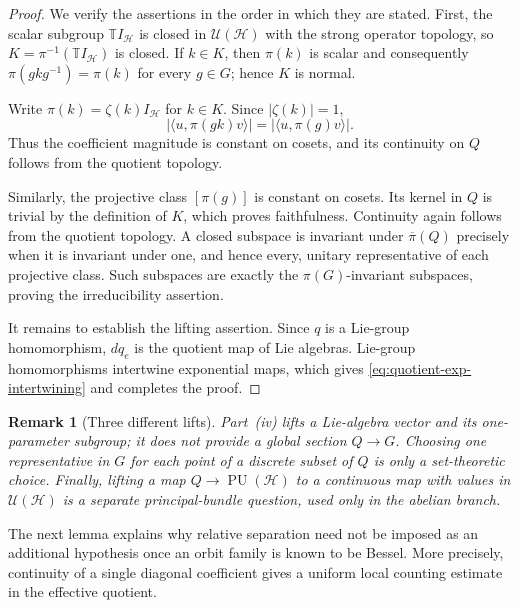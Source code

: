 \documentclass[10pt,a4paper]{amsart}
\numberwithin{equation}{section}
\newtheorem{remark}[theorem]{Remark}
\newcommand{\cH}{\mathcal H}
\newcommand{\T}{\mathbb T}
\newcommand{\U}{\mathcal U}
\newcommand{\PU}{\operatorname{PU}}
\begin{document}
\begin{proof}
We verify the assertions in the order in which they are stated.  First, the
scalar subgroup $\T I_{\cH}$ is closed in $\U(\cH)$ with the strong
operator topology, so $K=\pi^{-1}(\T I_{\cH})$ is closed.  If $k\in K$,
then $\pi(k)$ is scalar and consequently
$\pi(gkg^{-1})=\pi(k)$ for every $g\in G$; hence $K$ is normal.

Write $\pi(k)=\zeta(k)I_{\cH}$ for $k\in K$.  Since $|\zeta(k)|=1$,
\[
 |\langle u,\pi(gk)v\rangle|
 =|\langle u,\pi(g)v\rangle|.
\]
Thus the coefficient magnitude is constant on cosets, and its
continuity on $Q$ follows from the quotient topology.

Similarly, the projective class $[\pi(g)]$ is constant on cosets.  Its kernel
in $Q$ is trivial by the definition of $K$, which proves faithfulness.
Continuity again follows from the quotient topology.  A closed subspace is
invariant under $\overline\pi(Q)$ precisely when it is invariant under one,
and hence every, unitary representative of each projective class.  Such
subspaces are exactly the $\pi(G)$-invariant subspaces, proving the
irreducibility assertion.

It remains to establish the lifting assertion.  Since $q$ is a Lie-group
homomorphism, $dq_e$ is the quotient map of Lie algebras.  Lie-group
homomorphisms intertwine exponential maps, which gives
\eqref{eq:quotient-exp-intertwining} and completes the proof.
\end{proof}

\begin{remark}[Three different lifts]\label{rem:three-lifts}
Part~(iv) lifts a Lie-algebra vector and its one-parameter subgroup; it does
not provide a global section $Q\to G$.  Choosing one representative in $G$
for each point of a discrete subset of $Q$ is only a set-theoretic choice.
Finally, lifting a map $Q\to\PU(\cH)$ to a continuous map with values in
$\U(\cH)$ is a separate principal-bundle question, used only in the abelian
branch.
\end{remark}

The next lemma explains why relative separation need not be imposed as an
additional hypothesis once an orbit family is known to be Bessel.  More
precisely, continuity of a single diagonal coefficient gives a uniform local
counting estimate in the effective quotient.
\end{document}
